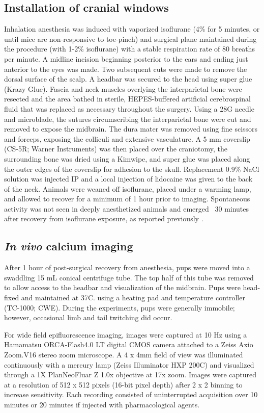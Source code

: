 \documentclass[9pt,lineno]{elife}
\begin{document}
\subsection{Installation of cranial windows}
Inhalation anesthesia was induced with vaporized isoflurane (4\% for 5 minutes, or until mice are non-responsive to toe-pinch) and surgical plane maintained during the procedure (with 1-2\% isoflurane) with a stable respiration rate of 80 breaths per minute. A midline incision beginning posterior to the ears and ending just anterior to the eyes was made. Two subsequent cuts were made to remove the dorsal surface of the scalp. A headbar was secured to the head using super glue (Krazy Glue). Fascia and neck muscles overlying the interparietal bone were resected and the area bathed in sterile, HEPES-buffered artificial cerebrospinal fluid that was replaced as necessary throughout the surgery. Using a 28G needle and microblade, the sutures circumscribing the interparietal bone were cut and removed to expose the midbrain. The dura mater was removed using fine scissors and forceps, exposing the colliculi and extensive vasculature. A 5 mm coverslip (CS-5R; Warner Instruments) was then placed over the craniotomy, the surrounding bone was dried using a Kimwipe, and super glue was placed along the outer edges of the coverslip for adhesion to the skull. Replacement 0.9\% NaCl solution was injected IP and a local injection of lidocaine was given to the back of the neck. Animals were weaned off isoflurane, placed under a warming lamp, and allowed to recover for a minimum of 1 hour prior to imaging. Spontaneous activity was not seen in deeply anesthetized animals and emerged ~30 minutes after recovery from isoflurane exposure, as reported previously \citep{Ackman2012}.

\subsection{\textit{In vivo} calcium imaging}
After 1 hour of post-surgical recovery from anesthesia, pups were moved into a swaddling 15 mL conical centrifuge tube. The top half of this tube was removed to allow access to the headbar and visualization of the midbrain. Pups were head-fixed and maintained at 37\textdegree C. using a heating pad and temperature controller (TC-1000; CWE). During the experiments, pups were generally immobile; however, occasional limb and tail twitching did occur.

For wide field epifluorescence imaging, images were captured at 10 Hz using a Hamamatsu ORCA-Flash4.0 LT digital CMOS camera attached to a Zeiss Axio Zoom.V16 stereo zoom microscope. A 4 x 4mm field of view was illuminated continuously with a mercury lamp (Zeiss Illuminator HXP 200C) and visualized through a 1X PlanNeoFluar Z 1.0x objective at 17x zoom. Images were captured at a resolution of 512 x 512 pixels (16-bit pixel depth) after 2 x 2 binning to increase sensitivity. Each recording consisted of uninterrupted acquisition over 10 minutes or 20 minutes if injected with pharmacological agents.
\end{document}
